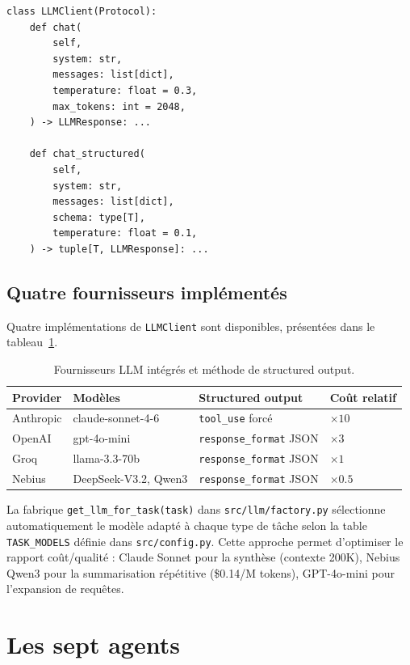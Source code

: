 \begin{lstlisting}[caption={Interface LLMClient (src/llm/base.py).}]
class LLMClient(Protocol):
    def chat(
        self,
        system: str,
        messages: list[dict],
        temperature: float = 0.3,
        max_tokens: int = 2048,
    ) -> LLMResponse: ...

    def chat_structured(
        self,
        system: str,
        messages: list[dict],
        schema: type[T],
        temperature: float = 0.1,
    ) -> tuple[T, LLMResponse]: ...
\end{lstlisting}

\subsection{Quatre fournisseurs implémentés}

Quatre implémentations de \texttt{LLMClient} sont disponibles,
présentées dans le tableau~\ref{tab:providers}.

\begin{table}[htbp]
  \centering
  \caption{Fournisseurs LLM intégrés et méthode de structured output.}
  \label{tab:providers}
  \begin{tabular}{llll}
    \toprule
    \textbf{Provider} & \textbf{Modèles} & \textbf{Structured output} & \textbf{Coût relatif} \\
    \midrule
    Anthropic & claude-sonnet-4-6 & \texttt{tool\_use} forcé & $\times 10$ \\
    OpenAI & gpt-4o-mini & \texttt{response\_format} JSON & $\times 3$ \\
    Groq & llama-3.3-70b & \texttt{response\_format} JSON & $\times 1$ \\
    Nebius & DeepSeek-V3.2, Qwen3 & \texttt{response\_format} JSON & $\times 0.5$ \\
    \bottomrule
  \end{tabular}
\end{table}

La fabrique \texttt{get\_llm\_for\_task(task)} dans \texttt{src/llm/factory.py}
sélectionne automatiquement le modèle adapté à chaque type de tâche
selon la table \texttt{TASK\_MODELS} définie dans \texttt{src/config.py}.
Cette approche permet d'optimiser le rapport coût/qualité : Claude Sonnet
pour la synthèse (contexte 200K), Nebius Qwen3 pour la summarisation
répétitive (\$0.14/M tokens), GPT-4o-mini pour l'expansion de requêtes.

\section{Les sept agents}
\label{sec:agents}


